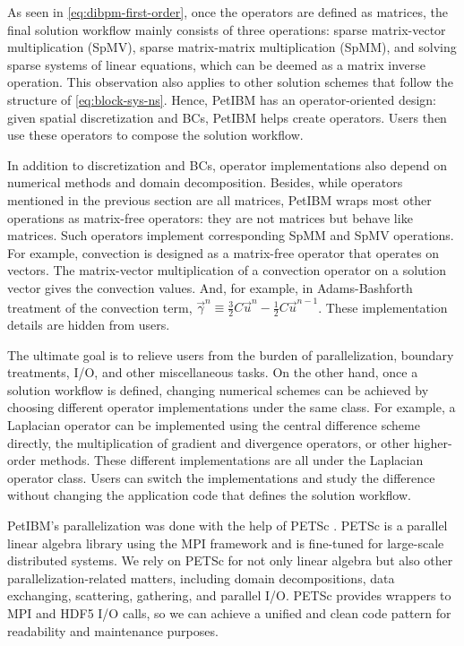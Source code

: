 

As seen in \eqref{eq:dibpm-first-order}, once the operators are defined as matrices, the final solution workflow mainly consists of three operations: sparse matrix-vector multiplication (SpMV), sparse matrix-matrix multiplication (SpMM), and solving sparse systems of linear equations, which can be deemed as a matrix inverse operation.
This observation also applies to other solution schemes that follow the structure of \eqref{eq:block-sys-ns}.
Hence, PetIBM has an operator-oriented design: given spatial discretization and BCs, PetIBM helps create operators.
Users then use these operators to compose the solution workflow.

In addition to discretization and BCs, operator implementations also depend on numerical methods and domain decomposition.
Besides, while operators mentioned in the previous section are all matrices, PetIBM wraps most other operations as matrix-free operators: they are not matrices but behave like matrices.
Such operators implement corresponding SpMM and SpMV operations.
For example, convection is designed as a matrix-free operator that operates on vectors.
The matrix-vector multiplication of a convection operator on a solution vector gives the convection values. 
And, for example, in Adams-Bashforth treatment of the convection term, $\vec{\gamma}^n \equiv \frac{3}{2}C\vec{u}^{n} - \frac{1}{2}C\vec{u}^{n-1}$.
These implementation details are hidden from users.

The ultimate goal is to relieve users from the burden of parallelization, boundary treatments, I/O, and other miscellaneous tasks.
On the other hand, once a solution workflow is defined, changing numerical schemes can be achieved by choosing different operator implementations under the same class.
For example, a Laplacian operator can be implemented using the central difference scheme directly, the multiplication of gradient and divergence operators, or other higher-order methods.
These different implementations are all under the Laplacian operator class.
Users can switch the implementations and study the difference without changing the application code that defines the solution workflow.

PetIBM's parallelization was done with the help of PETSc \cite{balay_petsc_2017}.
PETSc is a parallel linear algebra library using the MPI framework and is fine-tuned for large-scale distributed systems.
We rely on PETSc for not only linear algebra but also other parallelization-related matters, including domain decompositions, data exchanging, scattering, gathering, and parallel I/O.
PETSc provides wrappers to MPI and HDF5 I/O calls, so we can achieve a unified and clean code pattern for readability and maintenance purposes.

